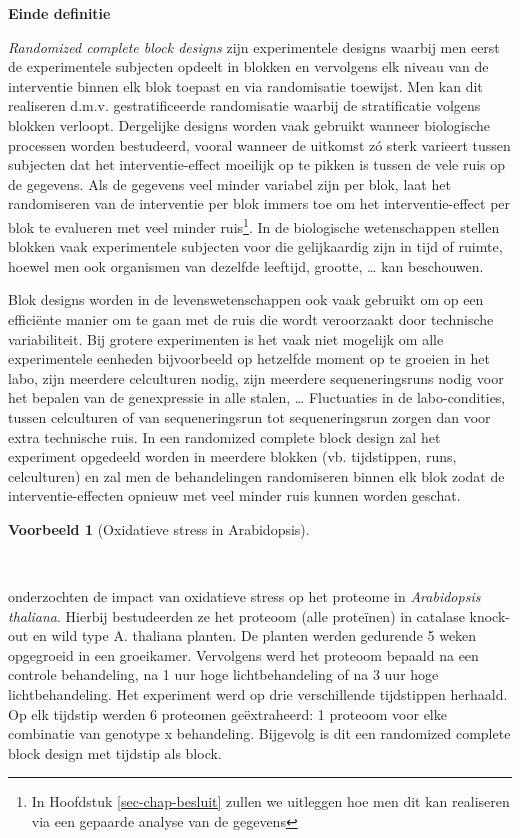 \documentclass[
  dutch,
  letterpaper,
  12pt]{book}
\theoremstyle{definition}
\theoremstyle{definition}
\theoremstyle{definition}
\newtheorem{example}{Voorbeeld}[chapter]
\theoremstyle{remark}
\begin{document}
\textbf{Einde definitie}

\emph{Randomized complete block designs} zijn experimentele designs
waarbij men eerst de experimentele subjecten opdeelt in blokken en
vervolgens elk niveau van de interventie binnen elk blok toepast en via
randomisatie toewijst. Men kan dit realiseren d.m.v. gestratificeerde
randomisatie waarbij de stratificatie volgens blokken verloopt.
Dergelijke designs worden vaak gebruikt wanneer biologische processen
worden bestudeerd, vooral wanneer de uitkomst zó sterk varieert tussen
subjecten dat het interventie-effect moeilijk op te pikken is tussen de
vele ruis op de gegevens. Als de gegevens veel minder variabel zijn per
blok, laat het randomiseren van de interventie per blok immers toe om
het interventie-effect per blok te evalueren met veel minder
ruis\footnote{In Hoofdstuk \ref{sec-chap-besluit} zullen we uitleggen
  hoe men dit kan realiseren via een gepaarde analyse van de gegevens}.
In de biologische wetenschappen stellen blokken vaak experimentele
subjecten voor die gelijkaardig zijn in tijd of ruimte, hoewel men ook
organismen van dezelfde leeftijd, grootte, \ldots{} kan beschouwen.

Blok designs worden in de levenswetenschappen ook vaak gebruikt om op
een efficiënte manier om te gaan met de ruis die wordt veroorzaakt door
technische variabiliteit. Bij grotere experimenten is het vaak niet
mogelijk om alle experimentele eenheden bijvoorbeeld op hetzelfde moment
op te groeien in het labo, zijn meerdere celculturen nodig, zijn
meerdere sequeneringsruns nodig voor het bepalen van de genexpressie in
alle stalen, \ldots{} Fluctuaties in de labo-condities, tussen
celculturen of van sequeneringsrun tot sequeneringsrun zorgen dan voor
extra technische ruis. In een randomized complete block design zal het
experiment opgedeeld worden in meerdere blokken (vb. tijdstippen, runs,
celculturen) en zal men de behandelingen randomiseren binnen elk blok
zodat de interventie-effecten opnieuw met veel minder ruis kunnen worden
geschat.

\begin{example}[Oxidatieve stress in
Arabidopsis]\protect\hypertarget{exm-oxidatieve-stress-in-arabidopsis}{}\label{exm-oxidatieve-stress-in-arabidopsis}

~

\end{example}

\citet{Jacques2015} onderzochten de impact van oxidatieve stress op het
proteome in \emph{Arabidopsis thaliana}. Hierbij bestudeerden ze het
proteoom (alle proteïnen) in catalase knock-out en wild type A. thaliana
planten. De planten werden gedurende 5 weken opgegroeid in een
groeikamer. Vervolgens werd het proteoom bepaald na een controle
behandeling, na 1 uur hoge lichtbehandeling of na 3 uur hoge
lichtbehandeling. Het experiment werd op drie verschillende tijdstippen
herhaald. Op elk tijdstip werden 6 proteomen geëxtraheerd: 1 proteoom
voor elke combinatie van genotype x behandeling. Bijgevolg is dit een
randomized complete block design met tijdstip als block.
\end{document}
